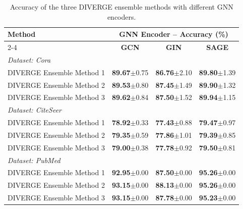 \documentclass[a4paper,fleqn]{cas-sc}
\begin{document}
\begin{table}[htbp]
\centering
\caption{Accuracy of the three DIVERGE ensemble methods with different GNN encoders.}
\label{tab:diverge_gnn_encoders}

\small
\setlength{\tabcolsep}{3pt}
\begin{tabular*}{\textwidth}{@{\extracolsep{\fill}} lccc @{}}
\toprule
\multirow{2}{*}{\textbf{Method}} & \multicolumn{3}{c}{\textbf{GNN Encoder -- Accuracy (\%)}} \\
\cmidrule(lr){2-4}
 & \textbf{GCN} & \textbf{GIN} & \textbf{SAGE} \\
\midrule
\multicolumn{4}{l}{\textit{Dataset: Cora}} \\
\midrule
DIVERGE Ensemble Method 1 & \textbf{89.67}{\scriptsize$\pm$0.75} & \textbf{86.76}{\scriptsize$\pm$2.10} & \textbf{89.80}{\scriptsize$\pm$1.39} \\
DIVERGE Ensemble Method 2 & \textbf{89.53}{\scriptsize$\pm$0.80} & \textbf{87.45}{\scriptsize$\pm$1.49} & \textbf{89.90}{\scriptsize$\pm$1.32} \\
DIVERGE Ensemble Method 3 & \textbf{89.62}{\scriptsize$\pm$0.84} & \textbf{87.50}{\scriptsize$\pm$1.52} & \textbf{89.94}{\scriptsize$\pm$1.15} \\
\midrule
\multicolumn{4}{l}{\textit{Dataset: CiteSeer}} \\
\midrule
DIVERGE Ensemble Method 1 & \textbf{78.92}{\scriptsize$\pm$0.33} & \textbf{77.43}{\scriptsize$\pm$0.88} & \textbf{79.47}{\scriptsize$\pm$0.97} \\
DIVERGE Ensemble Method 2 & \textbf{79.35}{\scriptsize$\pm$0.59} & \textbf{77.86}{\scriptsize$\pm$1.01} & \textbf{79.39}{\scriptsize$\pm$0.85} \\
DIVERGE Ensemble Method 3 & \textbf{79.00}{\scriptsize$\pm$0.38} & \textbf{77.78}{\scriptsize$\pm$0.92} & \textbf{79.50}{\scriptsize$\pm$0.81} \\
\midrule
\multicolumn{4}{l}{\textit{Dataset: PubMed}} \\
\midrule
DIVERGE Ensemble Method 1 & \textbf{92.95}{\scriptsize$\pm$0.00} & \textbf{87.50}{\scriptsize$\pm$0.00} & \textbf{95.26}{\scriptsize$\pm$0.00} \\
DIVERGE Ensemble Method 2 & \textbf{93.15}{\scriptsize$\pm$0.00} & \textbf{88.13}{\scriptsize$\pm$0.00} & \textbf{95.26}{\scriptsize$\pm$0.00} \\
DIVERGE Ensemble Method 3 & \textbf{93.15}{\scriptsize$\pm$0.00} & \textbf{87.78}{\scriptsize$\pm$0.00} & \textbf{95.23}{\scriptsize$\pm$0.00} \\

\end{tabular*}
\end{table}
\end{document}
